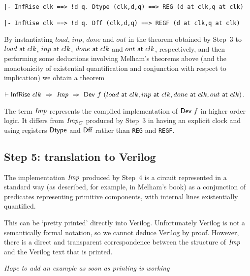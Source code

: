 {\baselineskip10pt\begin{verbatim}
|- InfRise clk ==> !d q. Dtype (clk,d,q) ==> REG (d at clk,q at clk)

|- InfRise clk ==> !d q. Dff (clk,d,q) ==> REGF (d at clk,q at clk)
\end{verbatim}}



By instantiating $load$, $inp$, $done$ and $out$ in the theorem
obtained by Step~3 to $load~\mathsf{at}~clk$, $inp~\mathsf{at}~clk$,
$done~\mathsf{at}~clk$ and $out~\mathsf{at}~clk$, respectively, and then
performing some deductions involving Melham's theorems above (and the
monotonicity of existential quantification and conjunction with
respect to implication) we obtain a theorem

\vspace*{2mm}

$\vdash \mathsf{InfRise}~clk~\Rightarrow~{\it{Imp}}~\Rightarrow~\mathsf{Dev}~f~(load~\mathsf{at}~clk,inp~\mathsf{at}~clk,done~\mathsf{at}~clk,out~\mathsf{at}~clk)$.

\vspace*{2mm}

The term ${\it{Imp}}$ represents the compiled implementation of $\mathsf{Dev}~f$ in higher order logic.
It differs from ${\it{Imp}}_C$ produced by Step~3 in having an explicit clock and using
registers $\mathsf{Dtype}$ and $\mathsf{Dff}$ rather than \texttt{REG} and \texttt{REGF}.

\subsection*{Step 5: translation to Verilog}

The implementation ${\it{Imp}}$ produced by Step~4 is a circuit
represented in a standard way (as described, for example, in Melham's book)
as a conjunction of predicates representing primitive components,
with internal lines existentially quantified.

This can be `pretty printed' directly into Verilog. Unfortunately Verilog is not a semantically formal notation,
so we cannot deduce Verilog by proof. However, there is a direct and transparent correspondence
between the structure of ${\it{Imp}}$ and the Verilog text that is printed.

\bigskip
{\it Hope to add an example as soon as printing is working}
\bigskip

